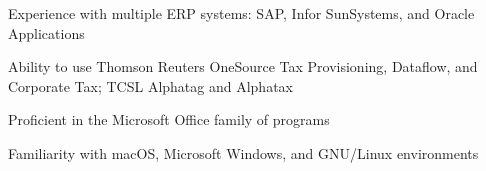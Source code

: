 


\begin{cvsimplelist}


    \item{Experience with multiple ERP systems: SAP, Infor SunSystems, and Oracle Applications}
    \item{Ability to use Thomson Reuters OneSource Tax Provisioning, Dataflow, and Corporate Tax; TCSL Alphatag and Alphatax}
    \item{Proficient in the Microsoft Office family of programs}
    \item{Familiarity with macOS, Microsoft Windows, and GNU/Linux environments}


\end{cvsimplelist}
